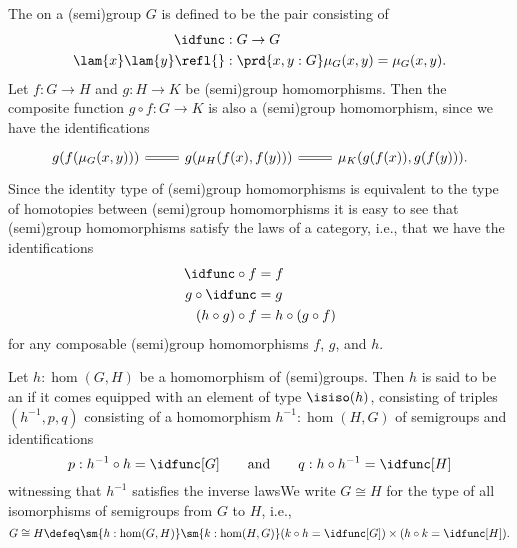 \begin{rmk}\label{rmk:category-semigroup}
  The  on a (semi)group $G$ is defined to be the pair consisting of
  \begin{align*}
    \idfunc & : G \to G \\
    \lam{x}\lam{y}\refl{} & : \prd{x,y:G} \mu_G(x,y) = \mu_G(x,y).
  \end{align*}
  Let $f:G\to H$ and $g:H\to K$ be (semi)group homomorphisms. Then the composite function $g\circ f:G\to K$ is also a (semi)group homomorphism, since we have the identifications
  \begin{equation*}
    \begin{tikzcd}
      {g(f(\mu_G(x,y)))} \arrow[r,equals] & {g(\mu_H(f(x),f(y)))} \arrow[r,equals] & {\mu_K(g(f(x)),g(f(y)))}.
    \end{tikzcd}
  \end{equation*}
  Since the identity type of (semi)group homomorphisms is equivalent to the type of homotopies between (semi)group homomorphisms it is easy to see that (semi)group homomorphisms satisfy the laws of a category, i.e., that we have the identifications
  \begin{align*}
    \idfunc\circ f & = f \\
    g\circ \idfunc & = g \\
    (h\circ g) \circ f & = h \circ (g \circ f)
  \end{align*}
  for any composable (semi)group homomorphisms $f$, $g$, and $h$.
\end{rmk}

\begin{defn}
Let $h:\hom(G,H)$ be a homomorphism of (semi)groups. Then $h$ is said to be an  if it comes equipped with an element of type $\isiso(h)$, consisting of triples $(h^{-1},p,q)$ consisting of a homomorphism $h^{-1}:\hom(H,G)$ of semigroups and identifications
\begin{equation*}
p:h^{-1}\circ h=\idfunc[G]\qquad\text{and}\qquad q:h\circ h^{-1}=\idfunc[H]
\end{equation*}
witnessing that $h^{-1}$ satisfies the inverse lawsWe write $G\cong H$ for the type of all isomorphisms of semigroups from $G$ to $H$, i.e.,
\begin{equation*}
G\cong H \defeq \sm{h:\hom(G,H)}\sm{k:\hom(H,G)} (k\circ h = \idfunc[G])\times (h\circ k=\idfunc[H]).
\end{equation*}
\end{defn}

